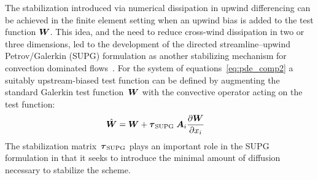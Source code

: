 The stabilization introduced via numerical dissipation in upwind differencing can be achieved in the finite element setting when an upwind bias is added to the test function ${\boldsymbol{W}}$.  This idea, and the need to reduce cross-wind dissipation in two or three dimensions, led to the development of the directed  streamline--upwind Petrov/Galerkin (SUPG) formulation as another stabilizing mechanism for convection dominated flows~\cite{ hughes_mallet_SUPG}.    For the system of equations~\eqref{eq:pde_comp2} a suitably upstream-biased test function can be defined by augmenting the standard Galerkin test function~${\boldsymbol{W}}$ with the convective operator acting on the test function:
\begin{align}
  \label{eq:test_function_SUPG}
  \hat{{\boldsymbol{W}}} &= {\boldsymbol{W}} + {\boldsymbol{\tau}}_{\text{SUPG}}\;{\boldsymbol{A}}_i{\frac{\partial{{\boldsymbol{W}}}}{\partial{x_i}}}
\end{align}
The stabilization matrix~${\boldsymbol{\tau}}_{\text{SUPG}}$ plays an important role in the SUPG formulation in that it seeks to introduce the minimal amount of diffusion necessary to stabilize the scheme.

